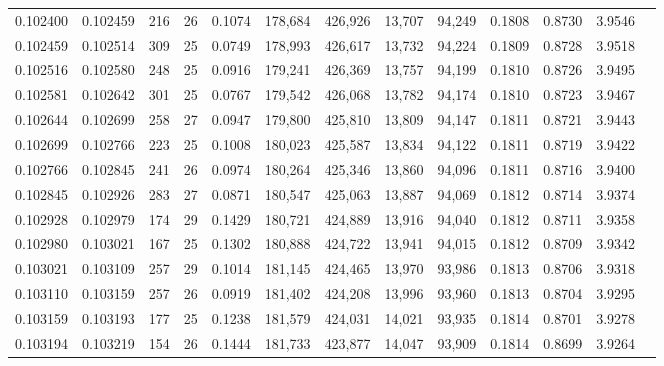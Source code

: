 \begin{tabular}{rrrrrrrrrrrrr}
0.102400 & 0.102459 & 216 &  26 &                                     0.1074 & 178,684 & 426,926 &  13,707 &  94,249 & 0.1808 & 0.8730 & 3.9546 \\
0.102459 & 0.102514 & 309 &  25 &                                     0.0749 & 178,993 & 426,617 &  13,732 &  94,224 & 0.1809 & 0.8728 & 3.9518 \\
0.102516 & 0.102580 & 248 &  25 &                                     0.0916 & 179,241 & 426,369 &  13,757 &  94,199 & 0.1810 & 0.8726 & 3.9495 \\
0.102581 & 0.102642 & 301 &  25 &                                     0.0767 & 179,542 & 426,068 &  13,782 &  94,174 & 0.1810 & 0.8723 & 3.9467 \\
0.102644 & 0.102699 & 258 &  27 &                                     0.0947 & 179,800 & 425,810 &  13,809 &  94,147 & 0.1811 & 0.8721 & 3.9443 \\
0.102699 & 0.102766 & 223 &  25 &                                     0.1008 & 180,023 & 425,587 &  13,834 &  94,122 & 0.1811 & 0.8719 & 3.9422 \\
0.102766 & 0.102845 & 241 &  26 &                                     0.0974 & 180,264 & 425,346 &  13,860 &  94,096 & 0.1811 & 0.8716 & 3.9400 \\
0.102845 & 0.102926 & 283 &  27 &                                     0.0871 & 180,547 & 425,063 &  13,887 &  94,069 & 0.1812 & 0.8714 & 3.9374 \\
0.102928 & 0.102979 & 174 &  29 &                                     0.1429 & 180,721 & 424,889 &  13,916 &  94,040 & 0.1812 & 0.8711 & 3.9358 \\
0.102980 & 0.103021 & 167 &  25 &                                     0.1302 & 180,888 & 424,722 &  13,941 &  94,015 & 0.1812 & 0.8709 & 3.9342 \\
0.103021 & 0.103109 & 257 &  29 &                                     0.1014 & 181,145 & 424,465 &  13,970 &  93,986 & 0.1813 & 0.8706 & 3.9318 \\
0.103110 & 0.103159 & 257 &  26 &                                     0.0919 & 181,402 & 424,208 &  13,996 &  93,960 & 0.1813 & 0.8704 & 3.9295 \\
0.103159 & 0.103193 & 177 &  25 &                                     0.1238 & 181,579 & 424,031 &  14,021 &  93,935 & 0.1814 & 0.8701 & 3.9278 \\
0.103194 & 0.103219 & 154 &  26 &                                     0.1444 & 181,733 & 423,877 &  14,047 &  93,909 & 0.1814 & 0.8699 & 3.9264 \\

\end{tabular}

